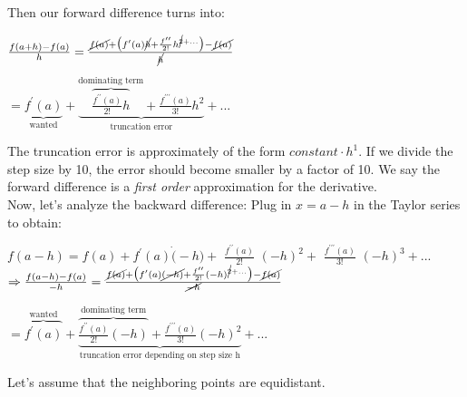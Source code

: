 \documentclass[a4paper,12pt]{report}
\begin{document}
	\noindent Then our forward difference turns into:

\begin{center}
	\Large $\frac{f(a+h)-f(a)}{h} = \frac{\cancel{f(a)} + \big( f^\prime(a)\cancel{h} +\frac{f^{\prime \prime}}{2!}h^{\cancel{2}+...}
	\big) - \cancel{f(a)} }{\cancel{h}}$ \normalsize \\
	\bigskip
	 
	$
	= \underbrace{f^\prime(a)}_{\text{wanted}}
	+ \underbrace{ \!\!\!\!\!\! \overbrace{\frac{f^{\prime \prime}(a)}{2!}h}^{\text{dominating term}} \!\!\!\!\!\! + \frac{f^{\prime \prime \prime}(a)}{3!}h^2}_{\text{truncation error}} + ...
	$
\end{center}

	\noindent The truncation error is approximately of the form $constant \cdot h^1$. If we divide the step size by 10, the error should become
	smaller by a factor of 10. We say the forward difference is a \textit{first order} approximation for the derivative.\\
	
	\noindent Now, let's analyze the backward difference: Plug in $x = a - h$ in the Taylor series to obtain:

\begin{center}
	$f(a-h) = f(a) + f^\prime(a) \dot (-h) + $ \large $\frac{f^{\prime \prime}(a)}{2!}$ \normalsize $\! \!(-h)^2 +$ \large
	$\frac{f^{\prime \prime \prime}(a)}{3!}$ \normalsize $\!\! (-h)^3 +...$ \\

	\bigskip
	\Large $\Rightarrow \frac{f(a-h)-f(a)}{-h} = \frac{\cancel{f(a)} + \big( f^\prime(a)\cancel{(-h)} +\frac{f^{\prime \prime}}{2!}
	(-h)^{\cancel{2}+...}\big) - \cancel{f(a)} }{\cancel{-h}}$ \normalsize \\
	\bigskip
	 
	$
	= \overbrace{f^\prime(a)}^{\text{wanted}}
	+ \!\!\!\! \underbrace{ \!\!\!\!\!\! \overbrace{\frac{f^{\prime \prime}(a)}{2!}(-h)}^{\text{dominating term}} \!\! + \frac{f^{\prime \prime \prime}(a)}{3!}(-h)^2}_{\text{truncation error depending on step size h}} \!\!\!\!\!\!\!\! + ...
	$
	
	\normalsize
\end{center}

	\bigskip
	Let's assume that the neighboring points are equidistant.
	
\end{document}
